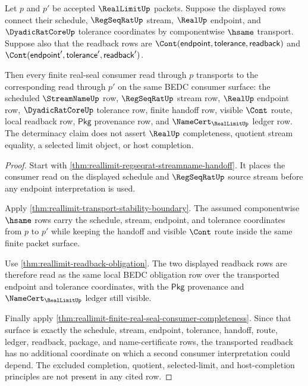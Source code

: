 \begin{theorem}
\label{thm:reallimit-finite-seal-readback-transport-determinacy}
Let $p$ and $p'$ be accepted $\RealLimitUp$ packets. Suppose the displayed
rows connect their schedule, $\RegSeqRatUp$ stream, $\RealUp$ endpoint, and
$\DyadicRatCoreUp$ tolerance coordinates by componentwise $\hsame$ transport.
Suppose also that the readback rows are
$\Cont(\mathsf{endpoint},\mathsf{tolerance},\mathsf{readback})$ and
$\Cont(\mathsf{endpoint}',\mathsf{tolerance}',\mathsf{readback}')$.

Then every finite real-seal consumer read through $p$ transports to the
corresponding read through $p'$ on the same BEDC consumer surface: the
scheduled $\StreamNameUp$ row, $\RegSeqRatUp$ stream row, $\RealUp$ endpoint
row, $\DyadicRatCoreUp$ tolerance row, finite handoff row, visible $\Cont$
route, local readback row, $\mathsf{Pkg}$ provenance row, and
$\NameCert_{\RealLimitUp}$ ledger row. The determinacy claim does not assert
$\RealUp$ completeness, quotient stream equality, a selected limit object, or
host completion.
\end{theorem}
\begin{proof}
Start with \autoref{thm:reallimit-regseqrat-streamname-handoff}. It places
the consumer read on the displayed schedule and $\RegSeqRatUp$ source stream
before any endpoint interpretation is used.

Apply \autoref{thm:reallimit-transport-stability-boundary}. The assumed
componentwise $\hsame$ rows carry the schedule, stream, endpoint, and
tolerance coordinates from $p$ to $p'$ while keeping the handoff and visible
$\Cont$ route inside the same finite packet surface.

Use \autoref{thm:reallimit-readback-obligation}. The two displayed readback
rows are therefore read as the same local BEDC obligation row over the
transported endpoint and tolerance coordinates, with the $\mathsf{Pkg}$
provenance and $\NameCert_{\RealLimitUp}$ ledger still visible.

Finally apply
\autoref{thm:reallimit-finite-real-seal-consumer-completeness}. Since that
surface is exactly the schedule, stream, endpoint, tolerance, handoff, route,
ledger, readback, package, and name-certificate rows, the transported readback
has no additional coordinate on which a second consumer interpretation could
depend. The excluded completion, quotient, selected-limit, and host-completion
principles are not present in any cited row.
\end{proof}

